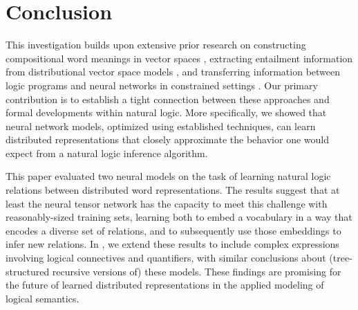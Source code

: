 \documentclass[letterpaper]{article}
\begin{document}
\section{Conclusion}\label{sec:discussion}

This investigation builds upon extensive prior research on
constructing compositional word meanings in vector spaces
\cite{ClarkCoeckeSadrzadeh2011,grefenstette2013towards,Hermann-etal:2013,rocktaschellow},
extracting entailment information from distributional vector space
models \cite{baroni2012entailment,rei2014looking}, and transferring
information between logic programs and neural networks in constrained
settings \cite{hitzler2004logic,holldobler1999approximating}. Our
primary contribution is to establish a tight connection between these
approaches and formal developments within natural logic.  More
specifically, we showed that neural network models, optimized using
established techniques, can learn distributed representations that
closely approximate the behavior one would expect from a natural logic
inference algorithm.


This paper evaluated two neural models on the task of learning 
natural logic relations between distributed word representations. The
results suggest that at least the neural tensor network
has the capacity to
meet this challenge with reasonably-sized training sets, learning both 
to embed a vocabulary in a way that encodes a diverse
set of relations, and to subsequently use those embeddings to infer new
relations. In
\cite{Bowman:Potts:Manning:2014}, we extend these results to include
complex expressions involving logical connectives and quantifiers, with similar
conclusions about (tree-structured recursive versions of) these models. These findings
are promising for the future of learned distributed representations in the
applied modeling of logical semantics.
\end{document}
